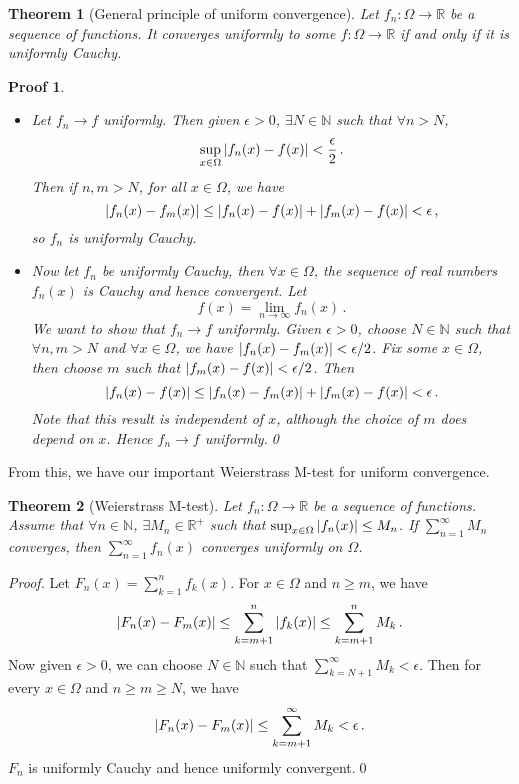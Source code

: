 \documentclass{article}
\theoremstyle{plain}\theoremheaderfont{\normalfont\itshape}\theorembodyfont{\rmfamily}\theoremseparator{.}\newtheorem*{rem}{Remark}\newtheorem*{ex}{Example}\newtheorem*{proof}{Proof}\newtheorem*{altp}{Alternative proof}
\theoremstyle{plain}\theoremheaderfont{\normalfont\bfseries}\theorembodyfont{\rmfamily}\theoremseparator{.}\newtheorem{thm}{Theorem}[section]\newtheorem{lem}[thm]{Lemma}\newtheorem{prop}[thm]{Proposition}\newtheorem*{cor}{Corollary}\newtheorem{defn}[thm]{Definition}\newtheorem{clm}[thm]{Claim}\newtheorem{clminproof}{Claim}
\theoremstyle{break}\theoremheaderfont{\normalfont\itshape}\theorembodyfont{\rmfamily}\theoremseparator{.\medskip}\newtheorem*{proofskip}{Proof}\newtheorem*{exs}{Examples}\newtheorem*{rems}{Remarks}
\theoremstyle{break}\theoremheaderfont{\normalfont\bfseries}\theorembodyfont{\rmfamily}\theoremseparator{.\medskip}\newtheorem{lemskip}[thm]{Lemma}\newtheorem{defnskip}[thm]{Definition}\newtheorem{propskip}[thm]{Proposition}\newtheorem{thmskip}[thm]{Theorem}
\newcommand{\qed}{\hfill\ensuremath{\Box}}
\begin{document}
    \begin{thm}[General principle of uniform convergence]
        Let \(f_n:\Omega\to\mathbb{R}\) be a sequence of functions. It converges uniformly to some \(f:\Omega\to\mathbb{R}\) if and only if it is uniformly Cauchy.
    \end{thm}
    \begin{proofskip}
        \begin{itemize}[topsep=0pt]
            \item[(\(\Rightarrow\))] Let \(f_n\to f\) uniformly. Then given \(\epsilon>0\), \(\exists N\in\mathbb{N}\) such that \(\forall n>N\),
            \[\sup_{x\in\Omega}\abs{f_n(x)-f(x)}<\frac{\epsilon}{2}\,.\]
            Then if \(n,m>N\), for all \(x\in\Omega\), we have
            \[\abs{f_n(x)-f_m(x)}\le\abs{f_n(x)-f(x)}+\abs{f_m(x)-f(x)}<\epsilon\,,\]
            so \(f_n\) is uniformly Cauchy.
            \item[(\(\Leftarrow\))] Now let \(f_n\) be uniformly Cauchy, then \(\forall x\in\Omega\), the sequence of real numbers \(f_n(x)\) is Cauchy and hence convergent. Let
            \[f(x)=\lim_{n\to\infty}f_n(x)\,.\]
            We want to show that \(f_n\to f\) uniformly. Given \(\epsilon>0\), choose \(N\in\mathbb{N}\) such that \(\forall n,m>N\) and \(\forall x\in \Omega\), we have \(\abs{f_n(x)-f_m(x)}<\epsilon/2\). Fix some \(x\in\Omega\), then choose \(m\) such that \(\abs{f_m(x)-f(x)}<\epsilon/2\). Then
            \[\abs{f_n(x)-f(x)}\le\abs{f_n(x)-f_m(x)}+\abs{f_m(x)-f(x)}<\epsilon\,.\]
            Note that this result is independent of \(x\), although the choice of \(m\) does depend on \(x\). Hence \(f_n\to f\) uniformly.\qed
        \end{itemize}
    \end{proofskip}

    From this, we have our important Weierstrass M-test for uniform convergence.

    \begin{thm}[Weierstrass M-test]
        Let \(f_n:\Omega\to\mathbb{R}\) be a sequence of functions. Assume that \(\forall n\in\mathbb{N}\), \(\exists M_n\in\mathbb{R}^+\) such that \(\sup_{x\in\Omega}\abs{f_n(x)}\le M_n\). If \(\sum_{n=1}^{\infty}M_n\) converges, then \(\sum_{n=1}^{\infty}f_n(x)\) converges uniformly on \(\Omega\).
    \end{thm}
    \begin{proof}
        Let \(F_n(x)=\sum_{k=1}^{n}f_k(x)\). For \(x\in\Omega\) and \(n\ge m\), we have
        \[\abs{F_n(x)-F_m(x)}\le\sum_{k=m+1}^{n}\abs{f_k(x)}\le\sum_{k=m+1}^{n}M_k\,.\]
        Now given \(\epsilon>0\), we can choose \(N\in\mathbb{N}\) such that \(\sum_{k=N+1}^{\infty}M_k<\epsilon\). Then for every \(x\in\Omega\) and \(n\ge m\ge N\), we have
        \[\abs{F_n(x)-F_m(x)}\le\sum_{k=m+1}^{\infty}M_k<\epsilon\,.\]
        \(F_n\) is uniformly Cauchy and hence uniformly convergent.\qed
    \end{proof}
\end{document}
